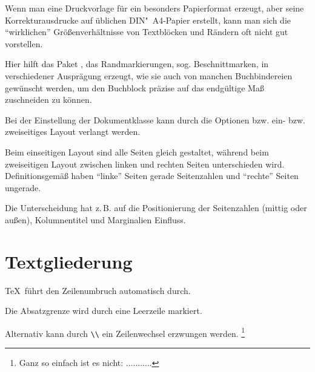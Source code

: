 
Wenn man eine Druckvorlage für ein besonders Papierformat erzeugt, aber seine Korrekturausdrucke
auf üblichen DIN"~A4-Papier erstellt, kann man sich die \enquote{wirklichen} Größenverhältnisse von
Textblöcken und Rändern oft nicht gut vorstellen.

Hier hilft das Paket , das Randmarkierungen, sog. Beschnittmarken, in verschiedener
Ausprägung erzeugt, wie sie auch von manchen Buchbindereien gewünscht werden, um den Buchblock
präzise auf das endgültige Maß zuschneiden zu können.



Bei der Einstellung der Dokumentklasse kann durch die Optionen  bzw.
 ein- bzw. zweiseitiges Layout verlangt werden.

Beim einseitigen Layout sind alle Seiten gleich gestaltet, während beim zweiseitigen Layout zwischen
linken und rechten Seiten unterschieden wird. Definitionsgemäß haben \enquote{linke} Seiten gerade
Seitenzahlen und \enquote{rechte} Seiten ungerade.

Die Unterscheidung hat z.\,B. auf die Positionierung der Seitenzahlen (mittig oder außen), 
Kolumnentitel und Marginalien Einfluss.


\section{Textgliederung}


\TeX\ führt den Zeilenumbruch automatisch durch.

Die Absatzgrenze wird durch eine Leerzeile markiert. 

Alternativ kann durch \lstinline/\\/ ein Zeilenwechsel erzwungen werden.%
\footnote{Ganz so einfach ist es nicht: ...........}



